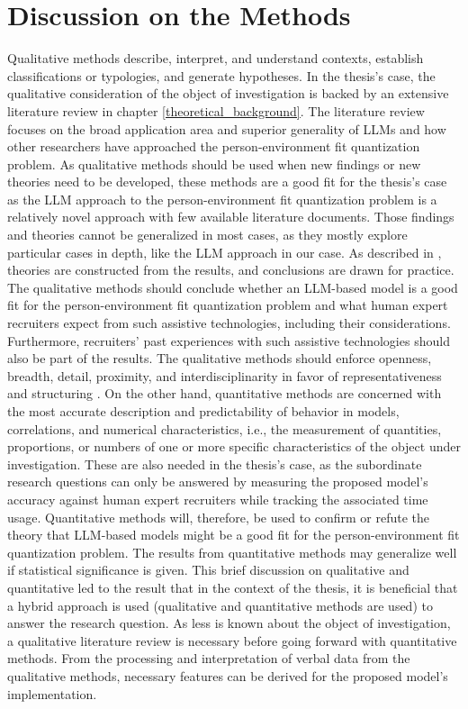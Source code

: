 \documentclass[draft,final]{thesisclass} %
\begin{document}
\section{Discussion on the Methods}
Qualitative methods describe, interpret, and understand contexts, establish classifications or typologies, and generate hypotheses. 
In the thesis's case, the qualitative consideration of the object of investigation is backed by an extensive literature review in chapter \ref{theoretical_background}.
The literature review focuses on the broad application area and superior generality of \acs{LLM}s and how other researchers have approached the person-environment fit quantization problem.
As qualitative methods should be used when new findings or new theories need to be developed, these methods are a good fit for the thesis's case as the \acs{LLM} approach to the person-environment fit quantization problem is a relatively novel approach with few available literature documents.
Those findings and theories cannot be generalized in most cases, as they mostly explore particular cases in depth, like the \acs{LLM} approach in our case. 
As described in \textcite[127]{qualitative_methods}, theories are constructed from the results, and conclusions are drawn for practice.
The qualitative methods should conclude whether an \acs{LLM}-based model is a good fit for the person-environment fit quantization problem and what human expert recruiters expect from such assistive technologies, including their considerations.
Furthermore, recruiters' past experiences with such assistive technologies should also be part of the results.
The qualitative methods should enforce openness, breadth, detail, proximity, and interdisciplinarity in favor of representativeness and structuring \parencite[127]{qualitative_methods}.
On the other hand, quantitative methods are concerned with the most accurate description and predictability of behavior in models, correlations, and numerical characteristics, i.e., the measurement of quantities, proportions, or numbers of one or more specific characteristics of the object under investigation.
These are also needed in the thesis's case, as the subordinate research questions can only be answered by measuring the proposed model's accuracy against human expert recruiters while tracking the associated time usage.
Quantitative methods will, therefore, be used to confirm or refute the theory that \acs{LLM}-based models might be a good fit for the person-environment fit quantization problem.
The results from quantitative methods may generalize well if statistical significance is given.
This brief discussion on qualitative and quantitative led to the result that in the context of the thesis, it is beneficial that a hybrid approach is used (qualitative and quantitative methods are used) to answer the research question.
As less is known about the object of investigation, a qualitative literature review is necessary before going forward with quantitative methods. 
From the processing and interpretation of verbal data from the qualitative methods, necessary features can be derived for the proposed model's implementation.
\end{document}
